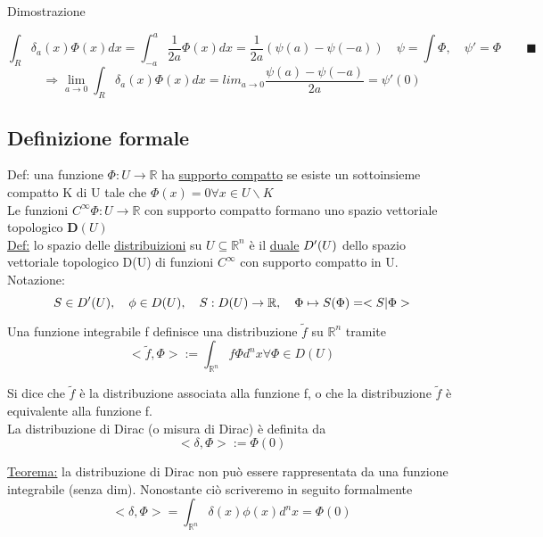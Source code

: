 \documentclass[a4paper,11pt]{report}
\newcommand{\Rn}{\mathbb{R}^n}
\begin{document}
Dimostrazione

$$
\int_R \delta_a (x)\Phi(x) dx= \int_{-a}^{a}\dfrac{1}{2a}\Phi(x) dx = \dfrac{1}{2a}\left(\psi(a)-\psi(-a)\right)
\quad \psi= \int \Phi,\quad \psi '=\Phi \qquad\blacksquare$$
$$
\Rightarrow \lim_{a\to 0}\int_{R}\delta_a(x)\Phi(x)dx=lim_{a\to 0}\dfrac{\psi(a)-\psi(-a)}{2a}=\psi '(0)
$$

\subsection{Definizione formale}
Def: una funzione $\Phi : U \rightarrow \mathbb{R} $ ha \underline{supporto compatto} se esiste un sottoinsieme compatto K di U tale che $\Phi(x)=0 \forall x \in U\backslash K $\\
Le funzioni $ C^{\infty} \Phi :U\rightarrow \mathbb{R}$ con supporto compatto formano uno spazio vettoriale topologico $\mathbf{D}(U)$\\

\underline{Def:} lo spazio delle \underline{distribuizioni} su $U \subseteq \mathbb{R}^n$ è il \underline{duale} $D\sp\prime(U)$ dello spazio vettoriale topologico D(U) di funzioni $C^{\infty}$ con supporto compatto in U.\\

Notazione: $$S \in D\sp\prime(U), \quad
\phi \in D(U), \quad
S : D(U)\rightarrow \mathbb{R}, \quad 
	\Phi \mapsto S(\Phi) = <S|\Phi>
$$

Una funzione integrabile f definisce una distribuzione $\tilde{f}$ su $\mathbb{R}^n$ tramite
\begin{equation}
<\tilde{f},\Phi> := \int_{\Rn} f \Phi d^{n}x
\forall \Phi \in D(U) 
\end{equation}


Si dice che $\tilde{f}$ è la distribuzione associata alla funzione f, o che la distribuzione $\tilde{f}$ è equivalente alla funzione f.\\
La distribuzione di Dirac (o misura di Dirac) è definita da 
\begin{equation}
<\delta,\Phi> := \Phi(0) 
\end{equation}

\underline{Teorema:} la distribuzione di Dirac non può essere rappresentata da una funzione integrabile (senza dim). Nonostante ciò scriveremo in seguito formalmente
\begin{equation}
<\delta , \Phi> = \int_{\Rn} \delta (x) \phi(x) d^n x= \Phi(0) 
\end{equation}
\end{document}
